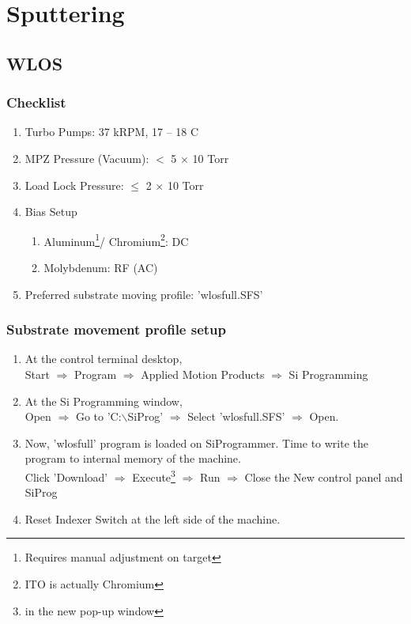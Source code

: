 

\section{Sputtering}
\subsection{WLOS}
\subsubsection{Checklist}
\begin{enumerate}
\item Turbo Pumps: 37 kRPM, 17 -- 18 C
\item MPZ Pressure (Vacuum): $<$ 5 $\times$ 10 Torr
\item Load Lock Pressure: $\leq$ 2 $\times$ 10 Torr
\item Bias Setup
  \begin{enumerate}
  \item Aluminum\footnote{Requires manual adjustment on target}/%
    Chromium\footnote{ITO is actually Chromium}: DC
  \item Molybdenum: RF (AC)		
  \end{enumerate}
\item Preferred substrate moving profile: 'wlosfull.SFS'
\end{enumerate}

\subsubsection{Substrate movement profile setup}
\begin{enumerate}
\item At the control terminal desktop,  \\ %
  Start $\Rightarrow$ Program $\Rightarrow$ %
  Applied Motion Products $\Rightarrow$ %
  Si Programming
\item At the Si Programming window, \\ %
  Open $\Rightarrow$ Go to 'C:$\backslash$SiProg' $\Rightarrow$ Select 'wlosfull.SFS'%
  $\Rightarrow$ Open.
\item Now, 'wlosfull' program is loaded on SiProgrammer. Time to write the program to internal memory of the machine. \\
  Click 'Download' $\Rightarrow$ Execute\footnote{in the new pop-up window} %
  $\Rightarrow$ Run $\Rightarrow$	Close the New control panel and SiProg
\item Reset Indexer Switch at the left side of the machine. 
\end{enumerate}

